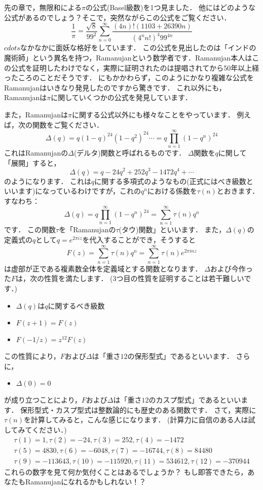 先の章で，無限和による$\pi$の公式(Basel級数)を1つ見ました．
他にはどのような公式があるのでしょう？そこで，突然ながらこの公式をご覧ください．
\[
\frac{1}{\pi}=\frac{\sqrt{8}}{99^2} \sum_{n=0}^{\infty}\frac{(4n)! (1103+26390n)}{(4^{n}n!)^{4}99^{4n}}
\]
$cdots$なかなかに面妖な格好をしています．
この公式を見出したのは「インドの魔術師」という異名を持つ，Ramanujanという数学者です．Ramanujan本人はこの公式を証明したわけでなく，実際に証明されたのは提唱されてから50年以上経ったころのことだそうです．
にもかかわらず，このようにかなり複雑な公式をRamanujanはいきなり発見したのですから驚きです．
これ以外にも，Ramanujanは$\pi$に関していくつかの公式を発見しています．

また，Ramanujanは$\pi$に関する公式以外にも様々なことをやっています．
例えば，次の関数をご覧ください．
\[
  \Delta (q)=q(1-q)^{24}(1-q^{2})^{24} \cdots = q\prod_{n=1}^{\infty}(1-q^n)^{24}
\]
これはRamanujanの$\Delta$(デルタ)関数と呼ばれるものです．
$\Delta$関数を$q$に関して「展開」すると，
\[
	\Delta (q)=q-24q^{2}+252q^{3}-1472q^{4}+\cdots
\]
のようになります．
これは$q$に関する多項式のようなもの(正式にはべき級数といいます)になっているわけですが，これの$q^n$における係数を$\tau (n)$とおきます．
すなわち：
\[
	\Delta (q)=q\prod_{n=1}^{\infty}(1-q^n)^{24} = \sum_{n=1}^{\infty} \tau (n) q^{n}
\]
です．
この関数$\tau$を「Ramanujanの$\tau$(タウ)関数」といいます．
また，$\Delta(q)$の定義式の$q$として$q=e^{2\pi iz}$を代入することができ，そうすると
\[
	F(z)=\sum_{n=1}^{\infty} \tau (n) q^{n}=\sum_{n=1}^{\infty} \tau (n) e^{2 \pi inz}
\]
は虚部が正である複素数全体を定義域とする関数となります．
$\Delta$および今作った$F$は，次の性質を満たします．
(3つ目の性質を証明することは若干難しいです．)
\begin{itemize}
	\item $\Delta (q)$は$q$に関するべき級数
	\item $F(z+1)=F(z)$
	\item $F(-1/z)=z^{12} F(z)$
\end{itemize}
この性質により，$F$および$\Delta$は「重さ$12$の保形型式」であるといいます．
さらに，
\begin{itemize}
	\item $\Delta(0)=0$
\end{itemize}
が成り立つことにより，$F$および$\Delta$は「重さ$12$のカスプ型式」であるといいます．
保形型式・カスプ型式は整数論的にも歴史のある関数です．
さて，実際に$\tau (n)$を計算してみると，こんな感じになります．
(計算力に自信のある人は試してみてください．)
\begin{eqnarray*}
\tau(1)=1, \tau(2)=-24, \tau(3)=252, \tau(4)=-1472 \\
\tau (5)=4830, \tau(6)=-6048, \tau(7)=-16744, \tau(8)=84480 \\
\tau(9)=-113643, \tau(10)=-115920, \tau(11)=534612, \tau(12)=-370944
\end{eqnarray*}
これらの数字を見て何か気付くことはあるでしょうか？
もし即答できたら，あなたもRamanujanになれるかもしれない！？

